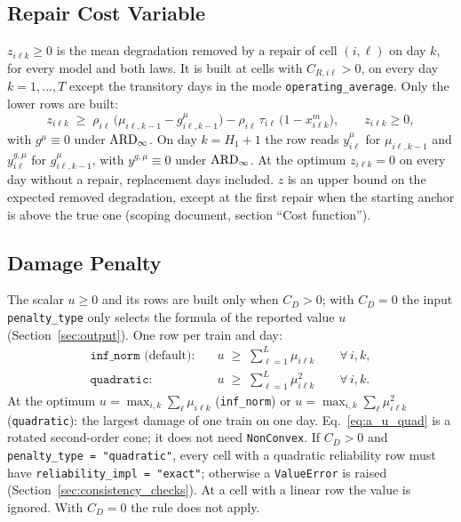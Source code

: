 
\subsection{Repair Cost Variable}
\label{sec:repair_cost}

$z_{i\ell k} \geq 0$ is the mean degradation removed by a repair of cell $(i,\ell)$ on
day $k$, for every model and both laws. It is built at cells with
$C_{R,i\ell} > 0$, on every day $k = 1, \ldots, T$ except the transitory days in the
mode \texttt{operating\_average}. Only the lower rows are built:
\begin{equation}
  z_{i\ell k} \;\geq\; \rho_{i\ell}\,\bigl(\mu_{i\ell,k-1} - g^{\mu}_{i\ell,k-1}\bigr)
    - \rho_{i\ell}\,\tau_{i\ell}\,\bigl(1 - x^m_{i\ell k}\bigr),
  \qquad z_{i\ell k} \geq 0,
  \label{eq:a_z}
\end{equation}
with $g^{\mu} \equiv 0$ under $\mathrm{ARD}_{\infty}$. On day $k = H_1 + 1$ the row reads
$y^{\mu}_{i\ell}$ for $\mu_{i\ell,k-1}$ and $y^{g,\mu}_{i\ell}$ for
$g^{\mu}_{i\ell,k-1}$, with $y^{g,\mu} \equiv 0$ under $\mathrm{ARD}_{\infty}$. At the optimum $z_{i\ell k} = 0$ on every day
without a repair, replacement days included. $z$ is an upper bound on the expected
removed degradation, except at the first repair when the starting anchor is above the
true one (scoping document, section ``Cost function'').

\subsection{Damage Penalty}
\label{sec:damage_reg}

The scalar $u \geq 0$ and its rows are built only when $C_D > 0$; with $C_D = 0$ the
input \texttt{penalty\_type} only selects the formula of the reported value $u$
(Section~\ref{sec:output}). One row per train and day:
\begin{align}
  \texttt{inf\_norm} \text{ (default)}:&\quad
    u \;\geq\; \sum_{\ell=1}^{L} \mu_{i\ell k} \qquad \forall\, i, k,
    \label{eq:a_u_inf} \\
  \texttt{quadratic}:&\quad
    u \;\geq\; \sum_{\ell=1}^{L} \mu_{i\ell k}^2 \qquad \forall\, i, k.
    \label{eq:a_u_quad}
\end{align}
At the optimum $u = \max_{i,k} \sum_{\ell} \mu_{i\ell k}$ (\texttt{inf\_norm}) or
$u = \max_{i,k} \sum_{\ell} \mu_{i\ell k}^2$ (\texttt{quadratic}): the largest damage of
one train on one day. Eq.~\eqref{eq:a_u_quad} is a rotated second-order cone; it does
not need \texttt{NonConvex}. If $C_D > 0$ and \texttt{penalty\_type = "quadratic"}, every cell
with a quadratic reliability row must have \texttt{reliability\_impl = "exact"};
otherwise a \texttt{ValueError} is raised (Section~\ref{sec:consistency_checks}). At a
cell with a linear row the value is ignored. With $C_D = 0$ the rule does not apply.

